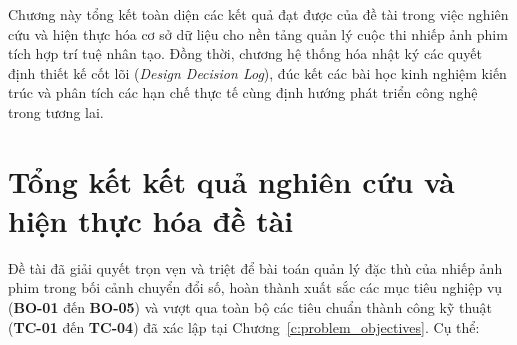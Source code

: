 
Chương này tổng kết toàn diện các kết quả đạt được của đề tài trong việc nghiên cứu và hiện thực hóa cơ sở dữ liệu cho nền tảng quản lý cuộc thi nhiếp ảnh phim tích hợp trí tuệ nhân tạo. Đồng thời, chương hệ thống hóa nhật ký các quyết định thiết kế cốt lõi (\textit{Design Decision Log}), đúc kết các bài học kinh nghiệm kiến trúc và phân tích các hạn chế thực tế cùng định hướng phát triển công nghệ trong tương lai.

\section{Tổng kết kết quả nghiên cứu và hiện thực hóa đề tài}
\label{s:c7_research_summary}

Đề tài đã giải quyết trọn vẹn và triệt để bài toán quản lý đặc thù của nhiếp ảnh phim trong bối cảnh chuyển đổi số, hoàn thành xuất sắc các mục tiêu nghiệp vụ (\textbf{BO-01} đến \textbf{BO-05}) và vượt qua toàn bộ các tiêu chuẩn thành công kỹ thuật (\textbf{TC-01} đến \textbf{TC-04}) đã xác lập tại Chương~\ref{c:problem_objectives}. Cụ thể:

